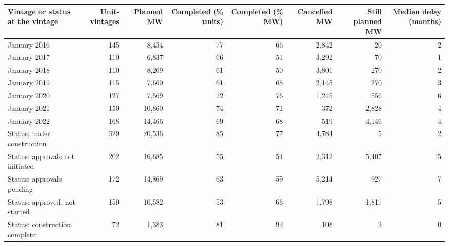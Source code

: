 \begin{tabular}{lrrrrrrr}
\toprule
Vintage or status at the vintage & Unit-vintages & Planned MW & Completed (\% units) & Completed (\% MW) & Cancelled MW & Still planned MW & Median delay (months) \\
\midrule
January 2016 & 145 & 8,454 & 77 & 66 & 2,842 & 20 & 2 \\
January 2017 & 110 & 6,837 & 66 & 51 & 3,292 & 70 & 1 \\
January 2018 & 110 & 8,209 & 61 & 50 & 3,801 & 270 & 2 \\
January 2019 & 115 & 7,660 & 61 & 68 & 2,145 & 270 & 3 \\
January 2020 & 127 & 7,569 & 72 & 76 & 1,245 & 556 & 6 \\
January 2021 & 150 & 10,860 & 74 & 71 & 372 & 2,828 & 4 \\
January 2022 & 168 & 14,466 & 69 & 68 & 519 & 4,146 & 4 \\
\midrule
Status: under construction & 329 & 20,536 & 85 & 77 & 4,784 & 5 & 2 \\
Status: approvals not initiated & 202 & 16,685 & 55 & 54 & 2,312 & 5,407 & 15 \\
Status: approvals pending & 172 & 14,869 & 63 & 59 & 5,214 & 927 & 7 \\
Status: approved, not started & 150 & 10,582 & 53 & 66 & 1,798 & 1,817 & 5 \\
Status: construction complete & 72 & 1,383 & 81 & 92 & 108 & 3 & 0 \\
\bottomrule
\end{tabular}